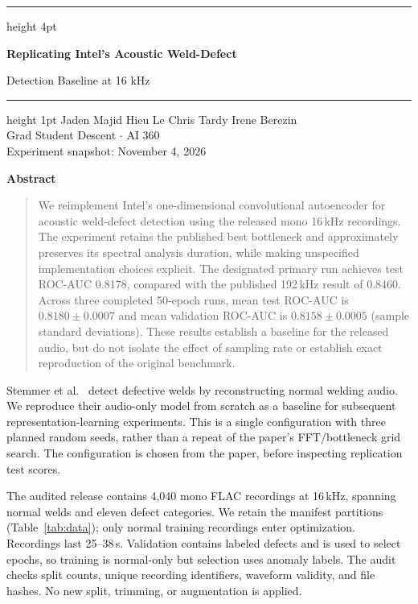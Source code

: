 \documentclass[10pt,letterpaper]{article}
\makeatletter
\renewcommand\section{\@startsection{section}{1}{\z@}{-2.0ex plus -.5ex}{.8ex}{\large\bfseries}}
\makeatother
\begin{document}
\begin{center}
\hrule height 4pt
\vspace{9pt}
{\LARGE\bfseries Replicating Intel's Acoustic Weld-Defect\par
Detection Baseline at 16 kHz\par}
\vspace{9pt}
\hrule height 1pt
\vspace{12pt}
{\normalsize Jaden Majid \quad Hieu Le \quad Chris Tardy \quad Irene Berezin}\\[3pt]
Grad Student Descent \quad $\cdot$ \quad AI 360\\[2pt]
{\small Experiment snapshot: November 4, 2026}
\end{center}
\vspace{-2pt}
\begin{center}\textbf{Abstract}\end{center}
\begin{quotation}\small
We reimplement Intel's one-dimensional convolutional autoencoder for acoustic
weld-defect detection using the released mono 16\,kHz recordings. The experiment
retains the published best bottleneck and approximately preserves its spectral
analysis duration, while making unspecified implementation choices explicit.
The designated primary run achieves test ROC-AUC 0.8178, compared with the
published 192\,kHz result of 0.8460. Across three completed 50-epoch runs,
mean test ROC-AUC is $0.8180\pm0.0007$ and mean validation ROC-AUC is
$0.8158\pm0.0005$ (sample standard deviations). These results establish a baseline for the released audio,
but do not isolate the effect of sampling rate or establish exact reproduction
of the original benchmark.
\end{quotation}

\section{Scope and data}
Stemmer et al.~\cite{stemmer2024} detect defective welds by reconstructing
normal welding audio. We reproduce their audio-only model from scratch as a
baseline for subsequent representation-learning experiments. This is a single
configuration with three planned random seeds, rather than a repeat of the
paper's FFT/bottleneck grid search. The configuration is chosen from the paper,
before inspecting replication test scores.

The audited release contains 4,040 mono FLAC recordings at 16\,kHz, spanning
normal welds and eleven defect categories. We retain the manifest partitions
(Table~\ref{tab:data}); only normal training recordings enter optimization.
Recordings last 25--38\,s. Validation contains labeled defects and is used to
select epochs, so training is normal-only but selection uses anomaly labels.
The audit checks split counts, unique recording identifiers, waveform validity,
and file hashes. No new split, trimming, or augmentation is applied.
\end{document}
